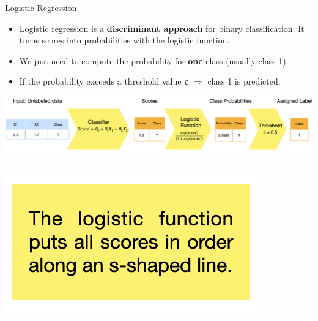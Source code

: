 \documentclass[11pt,compress,t,notes=noshow, xcolor=table]{beamer}
\begin{document}

\begin{vbframe}{Logistic Regression}

\begin{itemize}
\item \small Logistic regression is a \textbf{discriminant approach} for binary classification. It turns scores into probabilities with the logistic function.
\item \small We just need to compute the probability for \textbf{one} class (usually class 1).
\item \small If the probability exceeds a threshold value \textbf{c} $\Rightarrow$ class 1 is predicted.
\end{itemize}

\begin{center}
  \includegraphics[width = 1\textwidth]{slides/supervised-classification/figure_man/nutshell-classif-logistic-regression.png}
\end{center}
\begin{columns}
\begin{column}{0.35\textwidth} 
\begin{center}
\includegraphics[width=\textwidth]{slides/supervised-classification/figure_man/nutshell-classification-text-box-logisticreg.png}
\end{center}
\end{column}
\begin{column}{0.6\textwidth} 
\begin{center}


\end{center}
\end{column}
\end{columns}
\end{vbframe}
\end{document}
